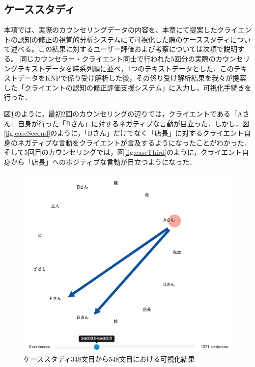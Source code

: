 \documentclass[shuuron]{kuee}
\begin{document}
\subsection{ケーススタディ} %

本項では、実際のカウンセリングデータの内容を、本章にて提案したクライエントの認知の修正の視覚的分析システムにて可視化した際のケーススタディについて述べる。この結果に対するユーザー評価および考察については次項で説明する。
同じカウンセラー・クライエント同士で行われた5回分の実際のカウンセリングテキストデータを時系列順に並べ，1つのテキストデータとした．このテキストデータをKNPで係り受け解析した後，その係り受け解析結果を我々が提案した「クライエントの認知の修正評価支援システム」に入力し，可視化手続きを行った．

図\ref{fig:caseFirst}のように，最初2回のカウンセリングの辺りでは，クライエントである「Aさん」自身が行った「Bさん」に対するネガティブな言動が目立った．しかし，図\ref{fig:caseSecond}のように，「Bさん」だけでなく「店長」に対するクライエント自身のネガティブな言動をクライエントが言及するようになったことがわかった．そして5回目のカウンセリングでは，図\ref{fig:caseThird}のように，クライエント自身から「店長」へのポジティブな言動が目立つようになった．


\begin{figure}
  \begin{center}
    \includegraphics[width=\linewidth]{caseFirst.png}
  \end{center}
  \caption{ケーススタディ348文目から548文目における可視化結果}
  \label{fig:caseFirst}
\end{figure}
\end{document}
